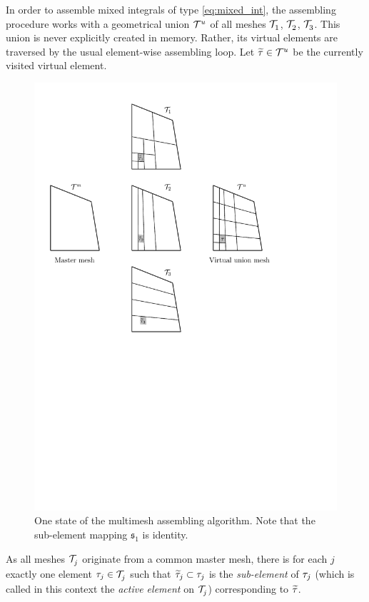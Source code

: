 In order to assemble mixed integrals of type \eqref{eq:mixed_int}, the assembling procedure works with a geometrical
union $\meshgen[u]{}$ of all meshes $\meshgen{1}$, $\meshgen{2}$, $\meshgen{3}$. This union is never explicitly created in
memory. Rather, its virtual elements are traversed by the usual element-wise assembling loop. Let $\widetilde\elem \in
\meshgen[u]{}$ be the currently visited virtual element. 
\begin{figure}[!hb]
  \centering \includegraphics[scale=.775]{multimesh} \caption[Multimesh assembling]{One state of the multimesh
  assembling algorithm. Note that the sub-element mapping $\mathfrak{s}_1$ is identity.}
 	\label{fig:multimesh}
\end{figure}
As all meshes $\meshgen{j}$ originate from a common master
mesh, there is for each $j$ exactly one element $\elem_j\in\meshgen{j}$ such that $\widetilde\elem_j\subset \elem_j$ is
the \textit{sub-element} of $\elem_j$ (which is called in this context the \textit{active element} on $\meshgen{j}$)
corresponding to $\widetilde\elem$.



